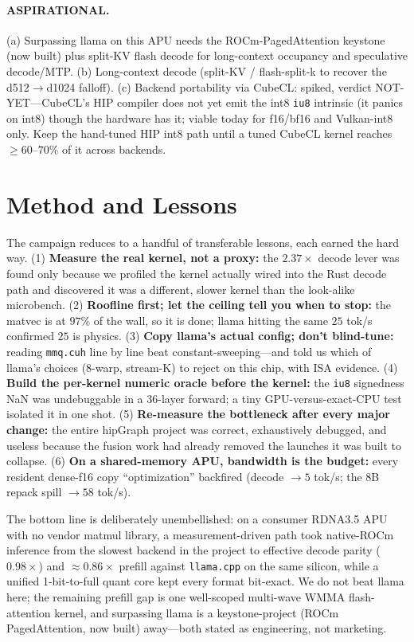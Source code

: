 \documentclass[11pt]{article}
\begin{document}
\paragraph{ASPIRATIONAL.}
(a) Surpassing llama on this APU needs the ROCm-PagedAttention keystone (now built) plus split-KV flash decode for long-context occupancy and speculative decode/MTP.
(b) Long-context decode (split-KV / flash-split-k to recover the d512$\to$d1024 falloff).
(c) Backend portability via CubeCL: spiked, verdict NOT-YET---CubeCL's HIP compiler does not yet emit the int8 \texttt{iu8} intrinsic (it panics on int8) though the hardware has it; viable today for f16/bf16 and Vulkan-int8 only. Keep the hand-tuned HIP int8 path until a tuned CubeCL kernel reaches $\geq 60$--$70\%$ of it across backends.

\section{Method and Lessons}

The campaign reduces to a handful of transferable lessons, each earned the hard way. (1) \textbf{Measure the real kernel, not a proxy:} the $2.37\times$ decode lever was found only because we profiled the kernel actually wired into the Rust decode path and discovered it was a different, slower kernel than the look-alike microbench. (2) \textbf{Roofline first; let the ceiling tell you when to stop:} the matvec is at $97\%$ of the wall, so it is done; llama hitting the same $25$ tok/s confirmed $25$ is physics. (3) \textbf{Copy llama's actual config; don't blind-tune:} reading \texttt{mmq.cuh} line by line beat constant-sweeping---and told us which of llama's choices ($8$-warp, stream-K) to reject on this chip, with ISA evidence. (4) \textbf{Build the per-kernel numeric oracle before the kernel:} the \texttt{iu8} signedness NaN was undebuggable in a 36-layer forward; a tiny GPU-versus-exact-CPU test isolated it in one shot. (5) \textbf{Re-measure the bottleneck after every major change:} the entire hipGraph project was correct, exhaustively debugged, and useless because the fusion work had already removed the launches it was built to collapse. (6) \textbf{On a shared-memory APU, bandwidth is the budget:} every resident dense-f16 copy ``optimization'' backfired (decode $\to 5$ tok/s; the 8B repack spill $\to 58$ tok/s).

The bottom line is deliberately unembellished: on a consumer RDNA3.5 APU with no vendor matmul library, a measurement-driven path took native-ROCm inference from the slowest backend in the project to effective decode parity ($0.98\times$) and $\approx 0.86\times$ prefill against \texttt{llama.cpp} on the same silicon, while a unified 1-bit-to-full quant core kept every format bit-exact. We do not beat llama here; the remaining prefill gap is one well-scoped multi-wave WMMA flash-attention kernel, and surpassing llama is a keystone-project (ROCm PagedAttention, now built) away---both stated as engineering, not marketing.
\end{document}
